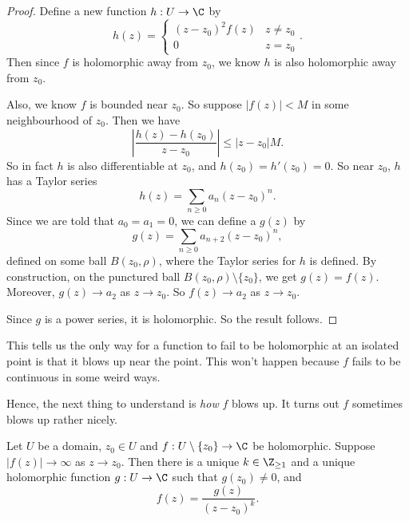 \documentclass[a4paper]{article}
\begin{document}
\begin{proof}
  Define a new function $h: U \to \C$ by
  \[
    h(z) =
    \begin{cases}
      (z - z_0)^2 f(z) & z \not= z_0\\
      0 & z = z_0
    \end{cases}.
  \]
  Then since $f$ is holomorphic away from $z_0$, we know $h$ is also holomorphic away from $z_0$.

  Also, we know $f$ is bounded near $z_0$. So suppose $|f(z)| < M$ in some neighbourhood of $z_0$. Then we have
  \[
    \left|\frac{h(z) - h(z_0)}{ z - z_0}\right| \leq |z - z_0| M.
  \]
  So in fact $h$ is also differentiable at $z_0$, and $h(z_0) = h'(z_0) = 0$. So near $z_0$, $h$ has a Taylor series
  \[
    h(z) = \sum_{n \geq 0} a_n(z - z_0)^n.
  \]
  Since we are told that $a_0 = a_1 = 0$, we can define a $g(z)$ by
  \[
    g(z) = \sum_{n \geq 0} a_{n + 2} (z - z_0)^n,
  \]
  defined on some ball $B(z_0, \rho)$, where the Taylor series for $h$ is defined. By construction, on the punctured ball $B(z_0, \rho) \setminus \{z_0\}$, we get $g(z) = f(z)$. Moreover, $g(z) \to a_2$ as $z \to z_0$. So $f(z) \to a_2$ as $z \to z_0$.

  Since $g$ is a power series, it is holomorphic. So the result follows.
\end{proof}
This tells us the only way for a function to fail to be holomorphic at an isolated point is that it blows up near the point. This won't happen because $f$ fails to be continuous in some weird ways.

Hence, the next thing to understand is \emph{how} $f$ blows up. It turns out $f$ sometimes blows up rather nicely.

\begin{prop}
  Let $U$ be a domain, $z_0 \in U$ and $f: U \setminus \{z_0\} \to \C$ be holomorphic. Suppose $|f(z)| \to \infty$ as $z \to z_0$. Then there is a unique $k \in \Z_{\geq 1}$ and a unique holomorphic function $g: U \to \C$ such that $g(z_0) \not= 0$, and
  \[
    f(z) = \frac{g(z)}{(z - z_0)^k}.
  \]
\end{prop}
\end{document}
